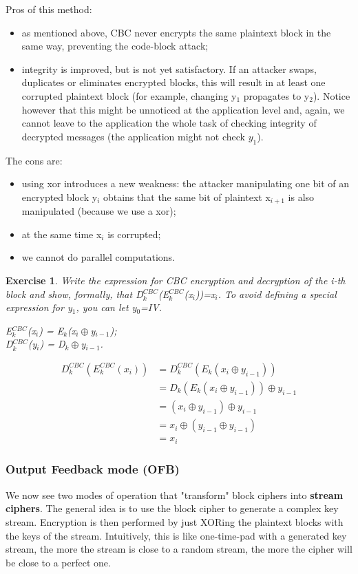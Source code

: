 \documentclass[a4paper, 12pt]{report}
\newtheorem{exercise}{\textbf{Exercise}}
\begin{document}
Pros of this method:
\begin{itemize}
	\item as mentioned above, CBC never encrypts the same plaintext block in the same way, preventing the code-block attack;
	\item integrity is improved, but is not yet satisfactory. If an attacker swaps, duplicates or eliminates encrypted blocks, this will result in at least one corrupted plaintext block (for example, changing y$_1$ propagates to y$_2$). Notice however that this might be unnoticed at the application level and, again, we cannot leave to the application the whole task of checking integrity of decrypted messages (the application might not check $y_1$). 
\end{itemize}

The cons are:
\begin{itemize}
	\item using xor introduces a new weakness: the attacker manipulating one bit of an encrypted block y$_i$ obtains that the same bit of plaintext x$_{i+1}$ is also manipulated (because we use a xor);
	\item at the same time x$_i$ is corrupted;
	\item we cannot do parallel computations.
\end{itemize}

\begin{exercise}
	Write the expression for CBC encryption and decryption of the i-th block and show, formally, that D$_k^{CBC}$(E$_k^{CBC}$(x$_i$))=x$_i$. To avoid defining a special expression for y$_1$, you can let y$_0$=IV.
	
	E$_k^{CBC}$(x$_i$) = E$_k$(x$_i \oplus$y$_{i-1}$);\\
	D$_k^{CBC}$(y$_i$) = D$_k \oplus$y$_{i-1}$.
	
	\setcounter{equation}{0}
	\begin{align}
		D_k^{CBC}(E_k^{CBC}(x_i)) &= D_k^{CBC}(E_k(x_i \oplus y_{i-1}))\\
		&= D_k(E_k(x_i \oplus y_{i-1})) \oplus y_{i-1}\\
		&= (x_i \oplus y_{i-1}) \oplus y_{i-1}\\
		&= x_i \oplus (y_{i-1} \oplus y_{i-1})\\
		&= x_i
	\end{align}
\end{exercise}

\subsubsection{Output Feedback mode (OFB)}
We now see two modes of operation that "transform" block ciphers into \textbf{stream ciphers}. The general idea is to use the block cipher to generate a complex key stream. Encryption is then performed by just XORing the plaintext blocks with the keys of the stream. Intuitively, this is like one-time-pad with a generated key stream, the more the stream is close to a random stream, the more the cipher will be close to a perfect one.
\end{document}

